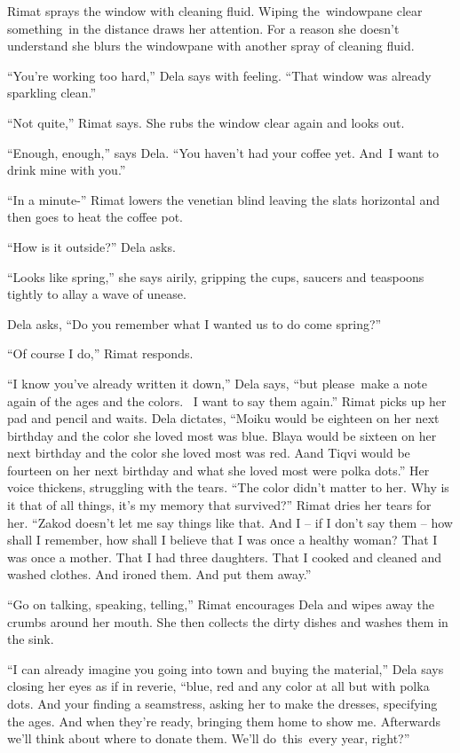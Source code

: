 \documentclass[twoside,11pt]{book}
\begin{document}
Rimat sprays the window with cleaning fluid. Wiping the\ windowpane clear something{\ }in the distance
draws her attention. For a reason she doesn't understand she blurs the windowpane with another spray of cleaning fluid.


``You're working too hard,'' Dela says with feeling. ``That window was already
sparkling clean.'' 

``Not quite,'' Rimat says. She rubs the window clear again and looks out. 

``Enough, enough,'' says Dela. ``You haven't had your coffee yet.
And{\ }I want to drink mine with you.'' 

``In a minute{}-'' Rimat lowers the venetian blind leaving the slats horizontal and then goes
to heat the coffee pot.

``How is it outside?'' Dela asks. 

``Looks like spring,'' she says airily, gripping the cups, saucers and teaspoons tightly to
allay a wave of unease.

Dela asks, ``Do you remember what I wanted us to do come spring?''

``Of course I do,'' Rimat responds. 

``I know you've already written it down,'' Dela says, ``but please~make a note again of the ages and the
colors. ~I want to say them again.'' Rimat picks up her pad and pencil and waits. Dela dictates,
``Moiku would be eighteen on her next birthday and the color she loved most was blue. Blaya would be
sixteen on her next birthday and the color she loved most was red. Aand Tiqvi would be fourteen on her next birthday
and what she loved most were polka dots.'' Her voice thickens, struggling with the tears.
``The color didn't matter to her. Why is it that of all things, it's my memory that
survived?'' Rimat dries her tears for her. ``Zakod doesn't let me say things like that. And I
-- if I don't say them -- how shall I remember, how shall I believe that I was once a healthy woman? That I was once a
mother. That I had three daughters. That I cooked and cleaned and washed clothes. And ironed them. And put them
away.'' 

``Go on talking, speaking, telling,'' Rimat encourages Dela and wipes away the crumbs around
her mouth. She then collects the dirty dishes and washes them in the sink. 

``I can already imagine you going into town and buying the material,'' Dela says closing her
eyes as if in reverie, ``blue, red and any color at all but with polka dots. And your finding a
seamstress, asking her to make the dresses, specifying the ages. And when they're ready, bringing them home to show me.
Afterwards we'll think about where to donate them. We'll do\ this\ every year, right?''
\end{document}
